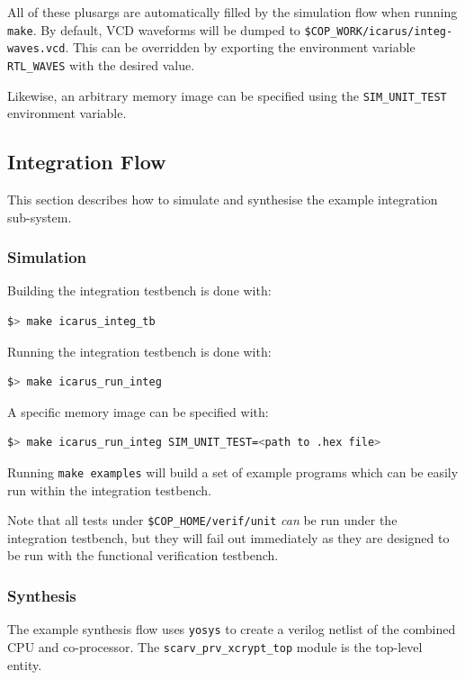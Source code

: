 All of these plusargs are automatically filled by the simulation flow
when running {\tt make}.
By default, VCD waveforms will be dumped to
{\tt \$COP\_WORK/icarus/integ-waves.vcd}.
This can be overridden by exporting the environment variable
{\tt RTL\_WAVES} with the desired value.

Likewise, an arbitrary memory image can be specified using the
{\tt SIM\_UNIT\_TEST} environment variable.


\subsection{Integration Flow}

This section describes how to simulate and synthesise the example
integration sub-system.

\subsubsection{Simulation}

Building the integration testbench is done with:
\begin{lstlisting}[language=bash]  
$> make icarus_integ_tb
\end{lstlisting}

Running the integration testbench is done with:

\begin{lstlisting}[language=bash]
$> make icarus_run_integ
\end{lstlisting}

A specific memory image can be specified with:

\begin{lstlisting}[language=bash]
$> make icarus_run_integ SIM_UNIT_TEST=<path to .hex file>
\end{lstlisting}

Running {\tt make examples} will build a set of example programs which can
be easily run within the integration testbench.

Note that all tests under {\tt \$COP\_HOME/verif/unit} {\em can} be run
under the integration testbench, but they will fail out immediately
as they are designed to be run with the functional verification testbench.

\subsubsection{Synthesis}

The example synthesis flow uses {\tt yosys} to create a verilog netlist of
the combined CPU and co-processor.
The {\tt scarv_prv_xcrypt_top} module is the top-level entity.

